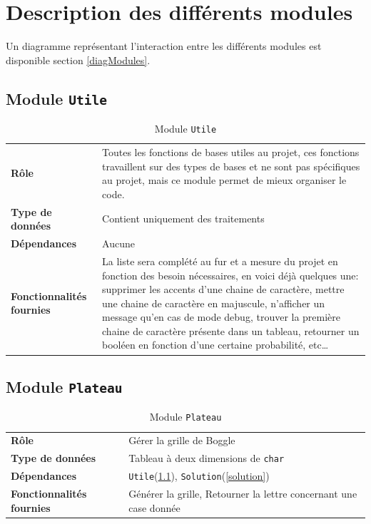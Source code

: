 \documentclass[12pt,a4paper,openany]{article}
\begin{document}
	\section{Description des différents modules}\label{listeModules}
	Un diagramme représentant l'interaction entre les différents modules est disponible section \ref{diagModules}.
	\subsection{Module \texttt{Utile}}\label{utile}
		\begin{table}[H]
			\centering
		\begin{tabular}{p{5cm} p{12cm}}
			\textbf{Rôle} & Toutes les fonctions de bases utiles au projet, ces fonctions tra\-vaillent sur des types de bases et ne sont pas spécifiques au
			projet, mais ce module permet de mieux organiser le code. \\
			\textbf{Type de données} & Contient uniquement des traitements\\ 
			\textbf{Dépendances} & Aucune\\ 
			\textbf{Fonctionnalités fournies} & La liste sera complété au fur et a mesure du projet en
			fonction des besoin nécessaires, en voici déjà quelques une: supprimer les accents d'une chaine de caractère, mettre une chaine de caractère en
			majuscule, n'afficher un message qu'en cas de mode debug, trouver la première chaine de caractère présente dans un tableau, retourner un booléen en
			fonction d'une certaine probabilité, etc\ldots 
		\end{tabular}
		\caption{Module \texttt{Utile}}
	\end{table}
	\subsection{Module \texttt{Plateau}}\label{plateau}
		\begin{table}[H]
			\centering
		\begin{tabular}{p{5cm} p{12cm}}
			\textbf{Rôle} & Gérer la grille de Boggle\\
			\textbf{Type de données} & Tableau à deux dimensions de \texttt{char} \\
			\textbf{Dépendances} & \texttt{Utile}(\ref{utile}), \texttt{Solution}(\ref{solution})\\
			\textbf{Fonctionnalités fournies} & Générer la grille, Retourner la lettre concernant une case donnée\\
		\end{tabular}
		\caption{Module \texttt{Plateau}}
	\end{table}
\end{document}

